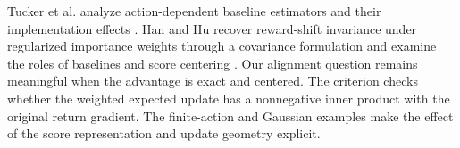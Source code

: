 Tucker et al. analyze action-dependent baseline estimators and their implementation effects \cite{tucker}. Han and Hu recover reward-shift invariance under regularized importance weights through a covariance formulation and examine the roles of baselines and score centering \cite{han}. Our alignment question remains meaningful when the advantage is exact and centered. The criterion checks whether the weighted expected update has a nonnegative inner product with the original return gradient. The finite-action and Gaussian examples make the effect of the score representation and update geometry explicit.
